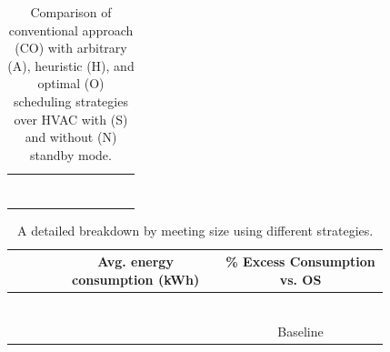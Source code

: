 
\begin{table}[t]
\centering
\begin{tabular}{p{0.1\linewidth} p{0.25\linewidth} p{0.25\linewidth} p{0.25\linewidth}}
\hline \centering{Strategy}  & \centering{Avg. energy consumption (kWh)} &  \centering{\% Consumption vs. CO} &  \centering{\% Excess Consumption vs. OS} \tabularnewline
\hline \centering{CO}  & \centering{522.86} &  \centering{Baseline} & \centering{330.9\%} \tabularnewline
\hline \centering{AN}  & \centering{212.14} &  \centering{40.57\%} &  \centering{74.84\%}\tabularnewline
\hline \centering{AS}  & \centering{199.94} &  \centering{38.24\%} &  \centering{64.78\%}\tabularnewline
\hline \centering{HN}  & \centering{184.26} &  \centering{35.24\%} &  \centering{51.86\%}\tabularnewline
\hline \centering{HS}  & \centering{177.32} &  \centering{33.91\%} &  \centering{46.14\%}\tabularnewline
\hline \centering{ON}  & \centering{124.13} &  \centering{23.74\%} &  \centering{2.30\%}\tabularnewline
\hline \centering{OS}  & \centering{121.34} &  \centering{23.21\%} &  \centering{Baseline} \tabularnewline
\hline
\end{tabular}
	\caption{Comparison of conventional approach (CO) with arbitrary (A), heuristic (H), and optimal (O) scheduling strategies over HVAC with (S) and without (N) standby mode.}
	\label{tab:sche_e}
\end{table}

\begin{table}[t]
\centering
\begin{tabular}{p{0.1\linewidth} p{0.12\linewidth} p{0.12\linewidth} p{0.12\linewidth} p{0.12\linewidth} p{0.12\linewidth} p{0.12\linewidth}}
\hline \centering{Strategy}  & \multicolumn{3}{c}{Avg. energy consumption (kWh)} &  \multicolumn{3}{c}{\% Excess Consumption vs. OS} \tabularnewline
\hline \centering{Meetings}  & \centering{10} &  \centering{20} & \centering{50} &  \centering{10} & \centering{20} & \centering{50} \tabularnewline
\hline \centering{AN}  & \centering{163.8} & \centering{219.8} & \centering{380.0} & \centering{64\%}  & \centering{95\%} & \centering{70\%} \tabularnewline
\hline \centering{AS}  & \centering{154.2} & \centering{206.0} & \centering{361.4} & \centering{55\%}  & \centering{83\%} & \centering{62\%}\tabularnewline
\hline \centering{HN}  & \centering{142.5} & \centering{178.8} & \centering{355.6} & \centering{43\%}  & \centering{59\%} & \centering{59\%}\tabularnewline
\hline \centering{HS}  & \centering{137.8} & \centering{172.0} & \centering{340.1} & \centering{38\%}  & \centering{53\%} & \centering{52\%}\tabularnewline
\hline \centering{ON}  & \centering{100.4} & \centering{115.8} & \centering{232.8} & \centering{0.8\%} & \centering{3\%}  & \centering{4\%}\tabularnewline
\hline \centering{OS}  & \centering{99.7}  & \centering{112.5} & \centering{223.4} & \multicolumn{3}{c}{Baseline} \tabularnewline
\hline
\end{tabular}
	\caption{A detailed breakdown by meeting size using different strategies.}
	\label{tab:sche_e_breakdown}
\end{table}

